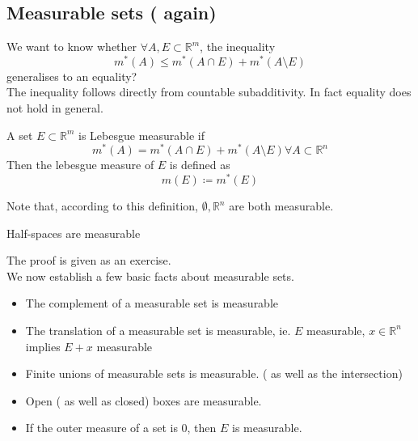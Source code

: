 \documentclass[../main.tex]{subfiles}
\begin{document}
\subsection{Measurable sets ( again) }
We want to know whether $\forall A,E \subset \mathbb{R}^m$, the inequality
\[ 
m^{*}( A) \leq m^{*}( A\cap E) + m^{*}( A \setminus E) 
\]
generalises to an equality?\\
The inequality follows directly from countable subadditivity.
In fact equality does not hold in general.
\begin{defn}
A set $E \subset \mathbb{R}^m$ is Lebesgue measurable if 
\[ 
m^{*}( A) = m^{*}( A\cap E) + m^{*}( A\setminus E) \forall A \subset \mathbb{R}^n
\]
Then the lebesgue measure of $E$ is defined as
\[ 
m( E) \coloneqq m^{*}( E) 
\]

\end{defn}
Note that, according to this definition, $\emptyset, \mathbb{R}^n$ are both measurable.
\begin{lemma}
Half-spaces are measurable
\end{lemma}
The proof is given as an exercise.\\
We now establish a few basic facts about measurable sets.
\begin{lemma}
\begin{itemize}
\item The complement of a measurable set is measurable
\item The translation of a measurable set is measurable, ie. $E$ measurable, $x\in \mathbb{R}^n$ implies $E+x$ measurable
\item Finite unions of measurable sets is measurable. ( as well as the intersection) 
\item Open ( as well as closed)  boxes are measurable.
\item If the outer measure of a set is $0$, then $E$ is measurable.	
\end{itemize}
\end{lemma}
\end{document}
